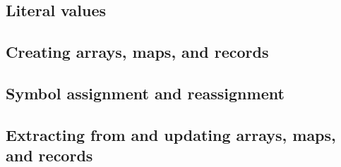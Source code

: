 \documentclass{article}
\theoremstyle{definition}
\begin{document}
\hypertarget{hsec:literals}{}
\subsection{Literal values}
\label{sec:literals}



\hypertarget{hsec:new-form}{}
\subsection{Creating arrays, maps, and records}
\label{sec:new-form}


\hypertarget{hsec:let-set}{}
\subsection{Symbol assignment and reassignment}
\label{sec:let-set}


\hypertarget{hsec:attr-form}{}
\subsection{Extracting from and updating arrays, maps, and records}
\label{sec:attr-form}
\end{document}
